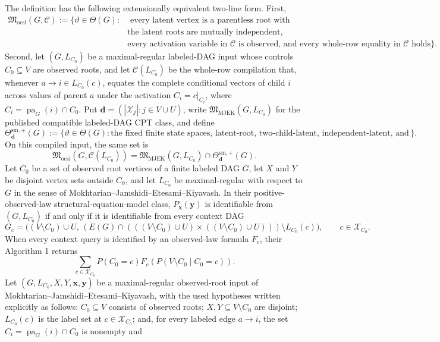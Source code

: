 The definition has the following extensionally equivalent two-line form. First,
\[
\begin{aligned}
\mathfrak M_{\mathrm{ocsi}}(G,\mathcal C)
:=\{\vartheta\in\Theta(G):{}&\text{ every latent vertex is a parentless root with exactly two observed children,}\\
&\text{the latent roots are mutually independent, every primitive CPT entry is strictly positive,}\\
&\text{every activation variable in }\mathcal C\text{ is observed, and every whole-row equality in }\mathcal C\text{ holds}\}.
\end{aligned}
\]
Second, let \((G,L_{C_0})\) be a maximal-regular labeled-DAG input whose controls \(C_0\subseteq V\) are observed roots, and let \(\mathcal C(L_{C_0})\) be the whole-row compilation that, whenever \(a\to i\in L_{C_0}(c)\), equates the complete conditional vectors of child \(i\) across values of parent \(a\) under the activation \(C_i=c|_{C_i}\), where \(C_i=\operatorname{pa}_G(i)\cap C_0\). Put \(\mathbf d=(|\mathcal X_j|:j\in V\cup U)\), write \(\mathfrak M_{\mathrm{MJEK}}(G,L_{C_0})\) for the published compatible labeled-DAG CPT class, and define
\[
\Theta^{\mathrm{sm},+}_{\mathbf d}(G)
:=\{\vartheta\in\Theta(G):\text{the fixed finite state spaces, latent-root, two-child-latent, independent-latent, and strict primitive-positivity restrictions hold}\}.
\]
On this compiled input, the same set is
\[
\mathfrak M_{\mathrm{ocsi}}\!\left(G,\mathcal C(L_{C_0})\right)
=\mathfrak M_{\mathrm{MJEK}}(G,L_{C_0})\cap\Theta^{\mathrm{sm},+}_{\mathbf d}(G).
\]
Let \(C_0\) be a set of observed root vertices of a finite labeled DAG \(G\), let \(X\) and \(Y\) be disjoint vertex sets outside \(C_0\), and let \(L_{C_0}\) be maximal-regular with respect to \(G\) in the sense of Mokhtarian--Jamshidi--Etesami--Kiyavash. In their positive-observed-law structural-equation-model class, \(P_{\mathbf x}(\mathbf y)\) is identifiable from \((G,L_{C_0})\) if and only if it is identifiable from every context DAG
\[
G_c=\bigl((V\setminus C_0)\cup U,\, (E(G)\cap(((V\setminus C_0)\cup U)\times((V\setminus C_0)\cup U)))\setminus L_{C_0}(c)\bigr),
\qquad c\in\mathcal X_{C_0}.
\]
When every context query is identified by an observed-law formula \(F_c\), their Algorithm 1 returns
\[
\sum_{c\in\mathcal X_{C_0}}P(C_0=c)F_c\!\left(P(V\setminus C_0\mid C_0=c)\right).
\]
Let \((G,L_{C_0},X,Y,\mathbf x,\mathbf y)\) be a maximal-regular observed-root input of Mokhtarian--Jamshidi--Etesami--Kiyavash, with the used hypotheses written explicitly as follows: \(C_0\subseteq V\) consists of observed roots; \(X,Y\subseteq V\setminus C_0\) are disjoint; \(L_{C_0}(c)\) is the label set at \(c\in\mathcal X_{C_0}\); and, for every labeled edge \(a\to i\), the set \(C_i=\operatorname{pa}_G(i)\cap C_0\) is nonempty and

